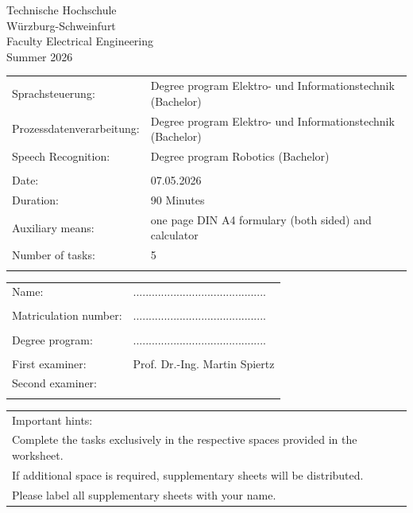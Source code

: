 \documentclass[12pt]{exam}
\begin{document}
\begin {center}
Technische Hochschule\\
Würzburg-Schweinfurt \\
Faculty Electrical Engineering\\
Summer 2026 \\
\end{center}

\begin{tabular}{ll}
Sprachsteuerung:& Degree program Elektro- und Informationstechnik (Bachelor) \\
Prozessdatenverarbeitung:& Degree program Elektro- und Informationstechnik (Bachelor) \\
Speech Recognition:& Degree program Robotics (Bachelor) \\
&\\
Date: & 07.05.2026 \\
Duration: & 90 Minutes \\
Auxiliary means: & one page DIN A4 formulary (both sided) and calculator \\
Number of tasks: & 5\\
&\\
\end{tabular}

\begin{tabular}{ll}
Name:&...........................................\\
&\\
Matriculation number:&...........................................\\
&\\
Degree program:&...........................................\\
&\\
First examiner:&Prof. Dr.-Ing. Martin Spiertz\\
Second examiner:&\\
&\\
\end{tabular}

\begin{tabular}{l}
Important hints: \\
Complete the tasks exclusively in the respective spaces provided in the worksheet.\\
If additional space is required, supplementary sheets will be distributed.\\
Please label all supplementary sheets with your name.
\end {tabular}
\end{document}
